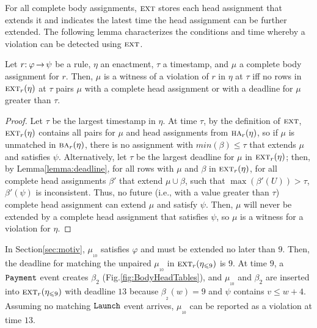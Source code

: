 For all complete body assignments,
$\textsc{ext}$ stores each head assignment
that extends it and indicates the latest time
the head assignment can be further extended.
The following lemma characterizes
the conditions and time whereby a violation
can be detected using $\textsc{ext}$.

\begin{lemma}\label{lemma:deadline_ext}
  Let $r{:}\:\varphi\,{\rightarrow}\,\psi$ be a rule,
  $\eta$ an enactment,
  $\tau$ a timestamp,
  and
  $\mu$ a complete body assignment for $r$.
  Then,
  $\mu$ is a witness of a violation of $r$ in $\eta$ at $\tau$
  iff
  no rows in $\textsc{ext}_r(\eta)$ at $\tau$ pairs $\mu$ with a complete head
  assignment
  or with a deadline for $\mu$ greater than $\tau$.
\end{lemma}

\begin{proof}
  Let $\tau$ be the largest timestamp in $\eta$.
  At time $\tau$,
  by the definition of $\textsc{ext}$,
  $\textsc{ext}_r(\eta)$ contains all pairs for $\mu$ and head assignments
  from $\HEAD/_r(\eta)$,
  so if $\mu$ is unmatched in $\BODY/_r(\eta)$,
  there is no assignment with $min(\beta)\leq \tau$
  that extends $\mu$ and satisfies $\psi$.
  Alternatively,
  let $\tau$ be the largest deadline for $\mu$ in $\textsc{ext}_r(\eta)$;
  then,
  by Lemma\:\ref{lemma:deadline},
  for all rows with $\mu$ and $\beta$ in $\textsc{ext}_r(\eta)$,
  for all complete head assignments $\beta'$ that extend
  $\mu\cup\beta$,
  such that $\max(\beta'(U))>\tau$, $\beta'(\psi)$ is inconsistent.
  Thus, no future (i.e., with a value greater than $\tau$) 
  complete head assignment can extend $\mu$ and satisfy $\psi$.
  Then, $\mu$ will never be extended by a complete head assignment
  that satisfies $\psi$,
  so $\mu$ is a witness for a violation for $\eta$.
\end{proof}

\begin{examp}
  In Section\:\ref{sec:motiv},
  $\mu_{_{10}}$ satisfies $\varphi$
  and must be extended no later than $9$.
  Then, the deadline for matching the unpaired $\mu_{_{10}}$
  in $\textsc{ext}_r(\eta_{\leqslant 9})$ is $9$.
  At time $9$,
  a $\texttt{Payment}$ event creates $\beta_2$
  (Fig.\:\ref{fig:BodyHeadTables}), and
  $\mu_{_{10}}$ and $\beta_2$ are inserted into $\textsc{ext}_r(\eta_{\leqslant 9})$
  with deadline $13$
  because $\beta_{_{2}}({w})=9$ and $\psi$ contains $v \leq {w}+4$.
  Assuming no matching $\texttt{Launch}$ event arrives,
  $\mu_{_{10}}$ can be reported as a violation at time $13$.
\end{examp}

